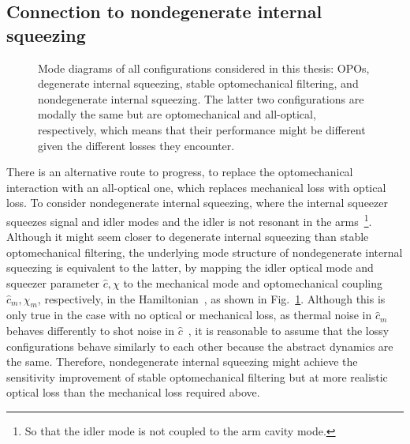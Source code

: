 


\subsection{Connection to nondegenerate internal squeezing}

\begin{figure}
	\centering
	\caption{Mode diagrams of all configurations considered in this thesis: OPOs, degenerate internal squeezing, stable optomechanical filtering, and nondegenerate internal squeezing. The latter two configurations are modally the same but are optomechanical and all-optical, respectively, which means that their performance might be different given the different losses they encounter.}
	\label{fig:mode_diagram}
\end{figure}

There is an alternative route to progress, to replace the optomechanical interaction with an all-optical one, which replaces mechanical loss with optical loss. To consider nondegenerate internal squeezing, where the internal squeezer squeezes signal and idler modes and the idler is not resonant in the arms~\footnote{So that the idler mode is not coupled to the arm cavity mode.}. 
Although it might seem closer to degenerate internal squeezing than stable optomechanical filtering, the underlying mode structure of nondegenerate internal squeezing is equivalent to the latter, by mapping the idler optical mode and squeezer parameter $\hat c, \chi$ to the mechanical mode and optomechanical coupling $\hat{c}_m, \chi_m$, respectively, in the Hamiltonian~\cite{}, as shown in Fig.~\ref{fig:mode_diagram}. Although this is only true in the case with no optical or mechanical loss, as thermal noise in $\hat{c}_m$ behaves differently to shot noise in $\hat c$~\cite{}, it is reasonable to assume that the lossy configurations behave similarly to each other because the abstract dynamics are the same. Therefore, nondegenerate internal squeezing might achieve the sensitivity improvement of stable optomechanical filtering but at more realistic optical loss than the mechanical loss required above.

